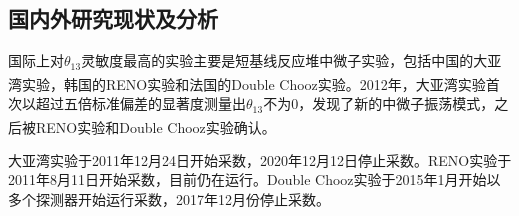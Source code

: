 \documentclass[a4paper,zihao=-4]{article}
\newcommand{\citess}[1]{\textsuperscript{\cite{#1}}}
\begin{document}
\subsection{国内外研究现状及分析}
国际上对$\theta_{13}$灵敏度最高的实验主要是短基线反应堆中微子实验，包括中国的大亚湾实验\citess{DayaBay:2022orm}，韩国的RENO实验\citess{RENO:2018dro}和法国的Double Chooz实验\citess{DoubleChooz:2019qbj}。2012年，大亚湾实验\citess{DayaBay:2012fng}首次以超过五倍标准偏差的显著度测量出$\theta_{13}$不为0，发现了新的中微子振荡模式，之后被RENO实验\citess{RENO:2012mkc}和Double Chooz实验\citess{DoubleChooz:2012gmf}确认。

大亚湾实验于2011年12月24日开始采数，2020年12月12日停止采数。RENO实验于2011年8月11日开始采数，目前仍在运行。Double Chooz实验于2015年1月开始以多个探测器开始运行采数，2017年12月份停止采数。
\end{document}
